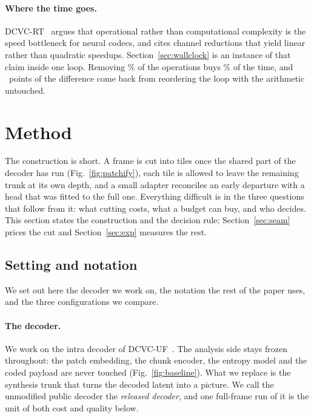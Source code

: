 \documentclass[10pt,twocolumn,letterpaper]{article}
\begin{document}
\paragraph{Where the time goes.} DCVC-RT~\cite{dcvcrt} argues that operational
rather than computational complexity is the speed bottleneck for neural codecs,
and cites channel reductions that yield linear rather than quadratic speedups.
Section~\ref{sec:wallclock} is an instance of that claim inside one loop.
Removing \WallPredicted\% of the operations buys \WallSorted\% of the time, and
\WallSortedGain\ points of the difference come back from reordering the loop with
the arithmetic untouched.

\section{Method}

The construction is short. A frame is cut into tiles once the shared part of the
decoder has run (Fig.~\ref{fig:patchify}), each tile is allowed to leave the remaining trunk at its own
depth, and a small adapter reconciles an early departure with a head that was
fitted to the full one. Everything difficult is in the three questions that
follow from it: what cutting costs, what a budget can buy, and who decides. This
section states the construction and the decision rule; Section~\ref{sec:seam}
prices the cut and Section~\ref{sec:exp} measures the rest.
\label{sec:method}

\subsection{Setting and notation}
\label{sec:setting}

We set out here the decoder we work on, the notation the rest of the paper uses,
and the three configurations we compare.

\paragraph{The decoder.} We work on the intra decoder of DCVC-UF~\cite{dcvcuf}.
The analysis side stays frozen throughout: the patch embedding, the chunk
encoder, the entropy model and the coded payload are never touched
(Fig.~\ref{fig:baseline}). What we replace is the synthesis trunk that turns the
decoded latent into a picture. We call the unmodified public decoder the
\emph{released decoder}, and one full-frame run of it is the unit of both cost
and quality below.
\end{document}
